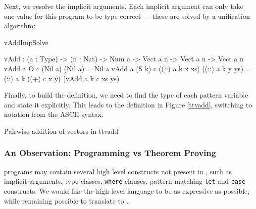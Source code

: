 Next, we resolve the implicit arguments. Each implicit argument can only take
one value for this program to be type correct --- these are solved by a unification
algorithm:

\begin{SaveVerbatim}{vAddImpSolve}

vAdd : (a : Type) -> (n : Nat) -> Num a -> Vect a n -> Vect a n -> Vect a n
vAdd a O     c (Nil a)         (Nil a)         = Nil a
vAdd a (S k) c ((::) a k x xs) ((::) a k y ys) 
                = (::) a k ((+) c x y) (vAdd a k c xs ys)

\end{SaveVerbatim}

Finally, to build the \TT{} definition, we need to find the type of each pattern variable
and state it explicitly. This leads to the \TT{} definition in Figure \ref{ttvadd}, 
switching to \TT{} notation from the ASCII \Idris{} syntax.

{Pairwise addition of vectors in \TT{}}
{ttvadd}

\subsubsection{An Observation: Programming vs Theorem Proving}

\Idris{} programs may contain several high level constructs not present in \TT{}, such
as implicit arguments, type classes, \texttt{where} clauses, pattern matching \texttt{let}
and \texttt{case} constructs. We would like the high level language to be as expressive
as possible, while remaining possible to translate to \TT{}.

